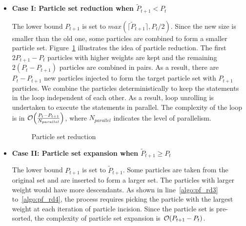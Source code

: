 \begin{itemize}
\item {\bf Case I: Particle set reduction when $\widetilde{P}_{t+1} < P_{t}$} 

The lower bound $P_{t+1}$ is set to $max\left(\lceil\widetilde{P}_{t+1}\rceil, P_{t}/2\right)$.
Since the new size is smaller than the old one, some particles are combined to form a smaller particle set.
Figure~\ref{fig:tuning} illustrates the idea of particle reduction.
The first $2P_{t+1}-P_{t}$ particles with higher weights are kept and the remaining $2(P_{t}-P_{t+1})$ particles are combined in pairs.
As a result, there are $P_{t}-P_{t+1}$ new particles injected to form the target particle set with $P_{t+1}$ particles.
We combine the particles deterministically to keep the statements in the loop independent of each other.
As a result, loop unrolling is undertaken to execute the statements in parallel.
The complexity of the loop is in $\mathop{}\mathopen{}\mathcal{O}\mathopen{}\left(\frac{P_{t}-P_{t+1}}{N_{parallel}}\right)$, where $N_{parallel}$ indicates the level of parallelism.

\setcounter{subfigure}{0}
\begin{figure}[t!]
\centering
{}
\caption{Particle set reduction}
\label{fig:tuning}
\end{figure}

\item {\bf Case II: Particle set expansion when $\widetilde{P}_{t+1} \geq P_{t}$}

The lower bound $P_{t+1}$ is set to $\widetilde{P}_{t+1}$.
Some particles are taken from the original set and are inserted to form a larger set.
The particles with larger weight would have more descendants.
As shown in line~\ref{algo:pf_rd3} to~\ref{algo:pf_rd4}, the process requires picking the particle with the largest weight at each iteration of particle incision.
Since the particle set is pre-sorted, the complexity of particle set expansion is $\mathop{}\mathopen{}\mathcal{O}\mathopen{}\left(P_{t+1}-P_{t}\right)$.

\end{itemize}

